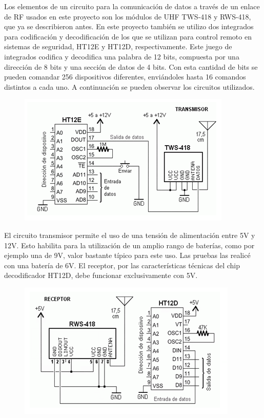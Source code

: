 \documentclass[a4paper,11pt]{article}
\begin{document}
Los elementos de un circuito para la comunicación de datos a través de un enlace de RF usados en este proyecto son los módulos de UHF TWS-418 y RWS-418, que ya se describieron antes.
En este proyecto también se utilizo dos integrados para codificación y decodificación de los que se utilizan para control remoto en sistemas de seguridad, HT12E y HT12D, respectivamente. Este juego de integrados codifica y decodifica una palabra de 12 bits, compuesta por una dirección de 8 bits y una sección de datos de 4 bits. Con esta cantidad de bits se pueden comandar 256 dispositivos diferentes, enviándoles hasta 16 comandos distintos a cada uno.
A continuación se pueden observar los circuitos utilizados.

	\begin{figure}[h]
		\centering
		\includegraphics[width=0.7\linewidth]{./5}
	\end{figure}
	
El circuito transmisor permite el uso de una tensión de alimentación entre 5V y 12V. Esto habilita para la utilización de un amplio rango de baterías, como por ejemplo una de 9V, valor bastante típico para este uso. Las pruebas las realicé con una batería de 6V. El receptor, por las características técnicas del chip decodificador HT12D, debe funcionar exclusivamente con 5V.

	\begin{figure}[h]
		\centering
		\includegraphics[width=0.7\linewidth]{./6}
	\end{figure}	
	
\end{document}
